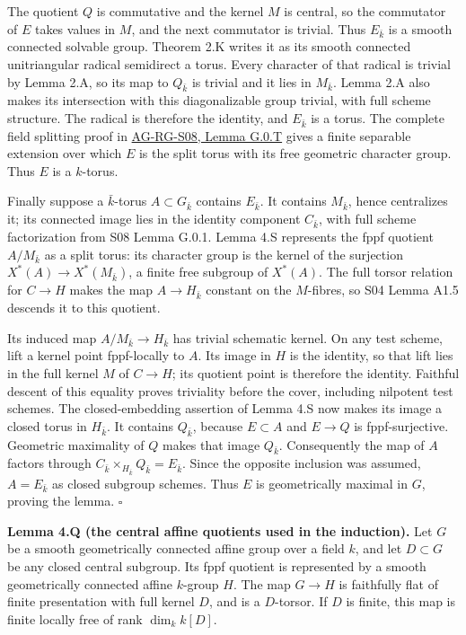 \documentclass[11pt,a4paper,openany]{report}
\begin{document}
The quotient \(Q\) is commutative and the kernel \(M\) is central, so the commutator of \(E\) takes values in \(M\), and the next commutator is trivial. Thus \(E_{\bar k}\) is a smooth connected solvable group. Theorem 2.K writes it as its smooth connected unitriangular radical semidirect a torus. Every character of that radical is trivial by Lemma 2.A, so its map to \(Q_{\bar k}\) is trivial and it lies in \(M_{\bar k}\). Lemma 2.A also makes its intersection with this diagonalizable group trivial, with full scheme structure. The radical is therefore the identity, and \(E_{\bar k}\) is a torus. The complete field splitting proof in \href{AG-RG-S08.html\#finite-separable-splitting}{AG-RG-S08, Lemma G.0.T} gives a finite separable extension over which \(E\) is the split torus with its free geometric character group. Thus \(E\) is a \(k\)-torus.

Finally suppose a \(\bar k\)-torus \(A\subset G_{\bar k}\) contains \(E_{\bar k}\). It contains \(M_{\bar k}\), hence centralizes it; its connected image lies in the identity component \(C_{\bar k}\), with full scheme factorization from S08 Lemma G.0.1. Lemma 4.S represents the fppf quotient \(A/M_{\bar k}\) as a split torus: its character group is the kernel of the surjection \(X^*(A)\to X^*(M_{\bar k})\), a finite free subgroup of \(X^*(A)\). The full torsor relation for \(C\to H\) makes the map \(A\to H_{\bar k}\) constant on the \(M\)-fibres, so S04 Lemma A1.5 descends it to this quotient.

Its induced map \(A/M_{\bar k}\to H_{\bar k}\) has trivial schematic kernel. On any test scheme, lift a kernel point fppf-locally to \(A\). Its image in \(H\) is the identity, so that lift lies in the full kernel \(M\) of \(C\to H\); its quotient point is therefore the identity. Faithful descent of this equality proves triviality before the cover, including nilpotent test schemes. The closed-embedding assertion of Lemma 4.S now makes its image a closed torus in \(H_{\bar k}\). It contains \(Q_{\bar k}\), because \(E\subset A\) and \(E\to Q\) is fppf-surjective. Geometric maximality of \(Q\) makes that image \(Q_{\bar k}\). Consequently the map of \(A\) factors through \(C_{\bar k}\times_{H_{\bar k}}Q_{\bar k}=E_{\bar k}\). Since the opposite inclusion was assumed, \(A=E_{\bar k}\) as closed subgroup schemes. Thus \(E\) is geometrically maximal in \(G\), proving the lemma. \(\square\)

\label{AG-RG-01-central-affine-quotient}

\textbf{Lemma 4.Q (the central affine quotients used in the induction).} Let \(G\) be a smooth geometrically connected affine group over a field \(k\), and let \(D\subset G\) be any closed central subgroup. Its fppf quotient is represented by a smooth geometrically connected affine \(k\)-group \(H\). The map \(G\to H\) is faithfully flat of finite presentation with full kernel \(D\), and is a \(D\)-torsor. If \(D\) is finite, this map is finite locally free of rank \(\dim_k k[D]\).
\end{document}
